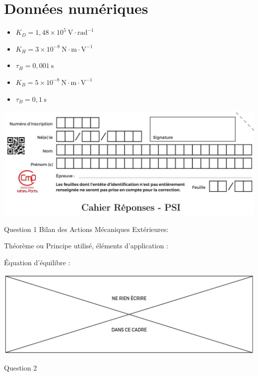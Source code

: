 \documentclass[10pt]{article}
\begin{document}
\section*{Données numériques}
\begin{itemize}
  \item $K_{D}=1,48 \times 10^{5} \mathrm{~V} \cdot \mathrm{rad}^{-1}$
  \item $K_{H}=3 \times 10^{-8} \mathrm{~N} \cdot \mathrm{m} \cdot \mathrm{V}^{-1}$
  \item $\tau_{H}=0,001 \mathrm{~s}$
  \item $K_{B}=5 \times 10^{-8} \mathrm{~N} \cdot \mathrm{m} \cdot \mathrm{V}^{-1}$
  \item $\tau_{B}=0,1 \mathrm{~s}$
\end{itemize}

\begin{center}
\includegraphics[max width=\textwidth]{2024_04_26_3285cfc264024262add0g-20}
\end{center}

Question 1 Bilan des Actions Mécaniques Extérieures:

Théorème ou Principe utilisé, éléments d'application :

Équation d'équilibre :

\begin{center}
\includegraphics[max width=\textwidth]{2024_04_26_3285cfc264024262add0g-21}
\end{center}

Question 2
\end{document}
